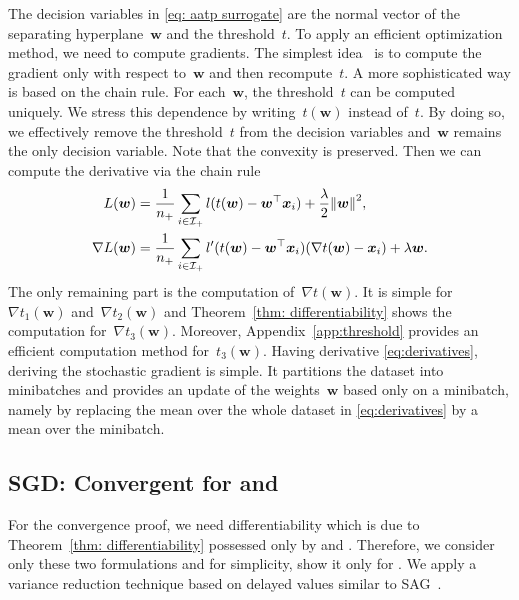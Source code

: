 The decision variables in \eqref{eq: aatp surrogate} are the normal vector of the separating hyperplane~$\bm{w}$ and the threshold~$t$. To apply an efficient optimization method, we need to compute gradients. The simplest idea~\cite{grill2016learning} is to compute the gradient only with respect to~$\bm{w}$ and then recompute~$t$. A more sophisticated way is based on the chain rule. For each~$\bm{w}$, the threshold~$t$ can be computed uniquely. We stress this dependence by writing~$t(\bm{w})$ instead of~$t$. By doing so, we effectively remove the threshold~$t$ from the decision variables and~$\bm{w}$ remains the only decision variable. Note that the convexity is preserved. Then we can compute the derivative via the chain rule
\begin{equation}\label{eq:derivatives}
  \begin{aligned}
  L(\bm{w})
    & = \frac{1}{\npos} \sum_{i \in \Ipos} l(t(\bm{w}) - \bm{w}^{\top} \bm{x}_i) + \frac{\lambda}{2}\norm{\bm{w}}^2, \\
  \nabla L(\bm{w})
    & = \frac{1}{\npos} \sum_{i \in \Ipos} l'(t(\bm{w}) - \bm{w}^{\top} \bm{x}_i)(\nabla t(\bm{w}) - \bm{x}_i) + \lambda \bm{w}.
  \end{aligned}
\end{equation}
The only remaining part is the computation of~$\nabla t(\bm{w})$. It is simple for~$\nabla t_1(\bm{w})$ and~$\nabla t_2(\bm{w})$ and Theorem~\ref{thm: differentiability} shows the computation for~$\nabla t_3(\bm{w})$. Moreover, Appendix~\ref{app:threshold} provides an efficient computation method for~$t_3(\bm{w})$. Having derivative \eqref{eq:derivatives}, deriving the stochastic gradient is simple. It partitions the dataset into minibatches and provides an update of the weights~$\bm{w}$ based only on a minibatch, namely by replacing the mean over the whole dataset in \eqref{eq:derivatives} by a mean over the minibatch.

\subsection{SGD: Convergent for \PatMat and \PatMatNP}

For the convergence proof, we need differentiability which is due to Theorem~\ref{thm: differentiability} possessed only by \PatMat and \PatMatNP. Therefore, we consider only these two formulations and for simplicity, show it only for \PatMat. We apply a variance reduction technique based on delayed values similar to SAG~\cite{schmidt2017minimizing}. 

